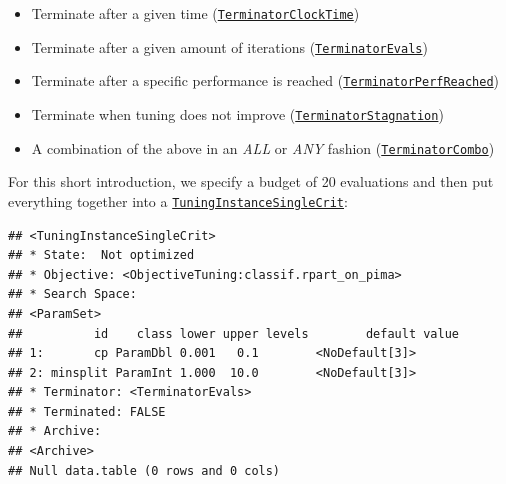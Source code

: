 \documentclass[]{scrbook}
\newenvironment{Shaded}{\begin{snugshade}}{\end{snugshade}}
\newcommand{\DataTypeTok}[1]{\textcolor[rgb]{0.13,0.29,0.53}{#1}}
\newcommand{\DecValTok}[1]{\textcolor[rgb]{0.00,0.00,0.81}{#1}}
\newcommand{\KeywordTok}[1]{\textcolor[rgb]{0.13,0.29,0.53}{\textbf{#1}}}
\newcommand{\NormalTok}[1]{#1}
\newcommand{\OperatorTok}[1]{\textcolor[rgb]{0.81,0.36,0.00}{\textbf{#1}}}
\newcommand{\StringTok}[1]{\textcolor[rgb]{0.31,0.60,0.02}{#1}}
\providecommand{\tightlist}{%
  \setlength{\itemsep}{0pt}\setlength{\parskip}{0pt}}
\renewenvironment{Shaded} {\begin{snugshade}\small} {\end{snugshade}}
\begin{document}
\begin{itemize}
\tightlist
\item
  Terminate after a given time (\href{https://bbotk.mlr-org.com/reference/mlr_terminators_clock_time.html}{\texttt{TerminatorClockTime}})
\item
  Terminate after a given amount of iterations (\href{https://bbotk.mlr-org.com/reference/mlr_terminators_evals.html}{\texttt{TerminatorEvals}})
\item
  Terminate after a specific performance is reached (\href{https://bbotk.mlr-org.com/reference/mlr_terminators_perf_reached.html}{\texttt{TerminatorPerfReached}})
\item
  Terminate when tuning does not improve (\href{https://bbotk.mlr-org.com/reference/mlr_terminators_stagnation.html}{\texttt{TerminatorStagnation}})
\item
  A combination of the above in an \emph{ALL} or \emph{ANY} fashion (\href{https://bbotk.mlr-org.com/reference/mlr_terminators_combo.html}{\texttt{TerminatorCombo}})
\end{itemize}

For this short introduction, we specify a budget of 20 evaluations and then put everything together into a \href{https://mlr3tuning.mlr-org.com/reference/TuningInstanceSingleCrit.html}{\texttt{TuningInstanceSingleCrit}}:

\begin{Shaded}
\end{Shaded}

\begin{verbatim}
## <TuningInstanceSingleCrit>
## * State:  Not optimized
## * Objective: <ObjectiveTuning:classif.rpart_on_pima>
## * Search Space:
## <ParamSet>
##          id    class lower upper levels        default value
## 1:       cp ParamDbl 0.001   0.1        <NoDefault[3]>      
## 2: minsplit ParamInt 1.000  10.0        <NoDefault[3]>      
## * Terminator: <TerminatorEvals>
## * Terminated: FALSE
## * Archive:
## <Archive>
## Null data.table (0 rows and 0 cols)
\end{verbatim}
\end{document}
